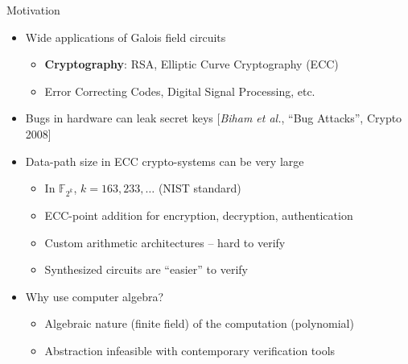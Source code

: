\documentclass[xcolor=dvipsnames]{beamer}
\newcommand{\bi}{\begin{itemize}}
\newcommand{\ei}{\end{itemize}}
\begin{document}
\begin{frame}{\large {Motivation}}
\vspace{-0.2in}

\begin{itemize}
\item Wide applications of Galois field circuits
	\begin{itemize}
	\item \textbf {Cryptography}: RSA, Elliptic
          Curve Cryptography (ECC) 
	\item Error Correcting Codes, Digital Signal Processing, etc.
	\end{itemize}	
\end{itemize}

\bi
\item Bugs in hardware can leak secret keys [{\it Biham et al.}, ``Bug
  Attacks'', Crypto 2008] 
\ei


 \begin{itemize}
 \item Data-path size in ECC crypto-systems can be very large
 	\begin{itemize}
        \item In $\mathbb{F}_{2^k}$, $k = 163, 233, \dots$ (NIST standard)
        \item ECC-point addition for encryption, decryption, authentication
 	\item Custom arithmetic architectures -- hard to verify
        \item Synthesized circuits are ``easier'' to verify
 	\end{itemize}
 \end{itemize}

\begin{itemize}
\item Why use computer algebra?
	\begin{itemize}
        \item Algebraic nature (finite field) of the computation (polynomial)
	\item Abstraction infeasible with contemporary verification tools 
	\end{itemize}
\end{itemize}

\end{frame}
\end{document}
